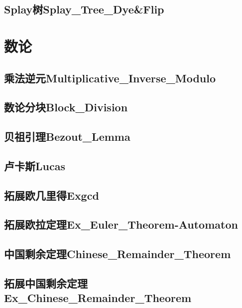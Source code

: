 \documentclass[10pt,a4paper]{article}
\begin{document}
\subsection{Splay树Splay\_Tree\_Dye\&Flip}

% 

\newpage
\section{数论}
\subsection{乘法逆元Multiplicative\_Inverse\_Modulo}

\subsection{数论分块Block\_Division}

\subsection{贝祖引理Bezout\_Lemma}

\subsection{卢卡斯Lucas}

\subsection{拓展欧几里得Exgcd}

\subsection{拓展欧拉定理Ex\_Euler\_Theorem-Automaton}

\subsection{中国剩余定理Chinese\_Remainder\_Theorem}

\subsection{拓展中国剩余定理Ex\_Chinese\_Remainder\_Theorem}

\end{document}
